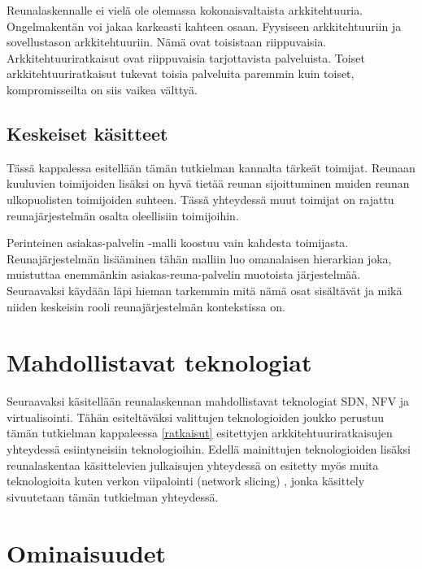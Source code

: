 \documentclass[finnish]{tktltiki2}
\theoremstyle{definition}
\theoremstyle{remark}
\begin{document}
Reunalaskennalle ei vielä ole olemassa kokonaisvaltaista arkkitehtuuria.
Ongelmakentän voi jakaa karkeasti kahteen osaan. Fyysiseen arkkitehtuuriin ja sovellustason arkkitehtuuriin. Nämä ovat toisistaan riippuvaisia.
Arkkitehtuuriratkaisut ovat riippuvaisia tarjottavista palveluista. Toiset arkkitehtuuriratkaisut tukevat toisia palveluita paremmin kuin toiset, kompromisseilta on siis vaikea välttyä.


\subsection{Keskeiset käsitteet}
Tässä kappalessa esitellään tämän tutkielman kannalta tärkeät toimijat.
Reunaan kuuluvien toimijoiden lisäksi on hyvä tietää reunan sijoittuminen muiden  reunan ulkopuolisten toimijoiden suhteen. Tässä yhteydessä muut toimijat on rajattu reunajärjestelmän osalta oleellisiin toimijoihin. 

Perinteinen asiakas-palvelin -malli koostuu vain kahdesta toimijasta. Reunajärjestelmän lisääminen tähän malliin luo omanalaisen hierarkian joka, muistuttaa enemmänkin asiakas-reuna-palvelin muotoista järjestelmää.
Seuraavaksi käydään läpi hieman tarkemmin mitä nämä osat sisältävät ja mikä niiden keskeisin rooli reunajärjestelmän kontekstissa on. 
 


\section{Mahdollistavat teknologiat}
Seuraavaksi käsitellään reunalaskennan mahdollistavat teknologiat SDN, NFV ja virtualisointi. Tähän esiteltäväksi valittujen teknologioiden joukko perustuu tämän tutkielman kappaleessa \ref{ratkaisut} esitettyjen arkkitehtuuriratkaisujen yhteydessä esiintyneisiin teknologioihin.
Edellä mainittujen teknologioiden lisäksi reunalaskentaa käsittelevien julkaisujen yhteydessä on esitetty myös muita teknologioita kuten verkon viipalointi (network slicing) \cite{taleb2017multi}, jonka käsittely sivuutetaan tämän tutkielman yhteydessä.






\section{Ominaisuudet}
\end{document}
